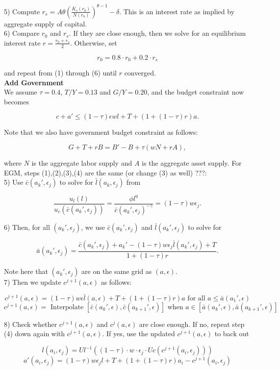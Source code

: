 \documentclass{article}
\begin{document}
		5) Compute $r_{s} = A\theta \left( \frac{K_{s}(r_{0})}{N(r_{0})} \right)^{\theta-1} -\delta$. This is an interest rate as implied by aggregate supply of capital. \\
		
		6) Compare $r_{0}$ and $r_{s}$. If they are close enough, then we solve for an equilibrium interest rate $r = \frac{r_{0}+r_{s}}{2}$. Otherwise, set 
		
		$$r_{0} = 0.8 \cdot r_{0} + 0.2 \cdot r_{s}$$
		
		and repeat from (1) through (6) until $r$ converged. \\
		
		\noindent\textbf{\Large Add Government} \\
		
		We assume $\tau = 0.4$, $T/Y = 0.13$ and $G/Y = 0.20$, and the budget constraint now becomes
		
		$$c+a' \leq (1 -\tau)\epsilon w l + T + (1 + (1 -\tau)r)a.$$
		
		Note that we also have government budget constraint as follows:
		
		$$G + T + rB = B' - B + \tau(wN + rA),$$
		
		where $N$ is the aggregate labor supply and $A$ is the aggregate asset supply. For EGM, steps (1),(2),(3),(4) are the same (or change (3) as well) ???: \\
		
		5) Use $\bar{c}(a_{k}', \epsilon_{j})$ to solve for $\bar{l}(a_{k}, \epsilon_{j})$ from
		
		$$\frac{u_{l}(l)}{u_{c}(\bar{c}(a_{k}', \epsilon_{j}))} = \frac{\phi l^{\eta}}{\bar{c}(a_{k}', \epsilon_{j})^{-\gamma}} = (1-\tau)w\epsilon_{j}.$$
		
		6) Then, for all $(a_{k}',\epsilon_{j})$, we use $\bar{c}(a_{k}',\epsilon_{j})$ and $\bar{l}(a_{k}',\epsilon_{j})$ to solve for 
		
		$$\bar{a}(a_{k}', \epsilon_{j}) = \frac{\bar{c}(a_{k}', \epsilon_{j}) + a_{k}' - (1-\tau) w\epsilon_{j}\bar{l}(a_{k}',\epsilon_{j}) + T}{1+(1-\tau)r}.$$
		
		Note here that $(a_{k}', \epsilon_{j})$ are on the same grid as $(a,\epsilon)$. \\
		
		7) Then we update $c^{j+1}(a,\epsilon)$ as follows:
		
		$$c^{j+1}(a,\epsilon) = (1-\tau) w \epsilon\bar{l}(a,\epsilon) + T + (1+(1-\tau)r)a  \text{ for all } a \leq \bar{a}(a_{1}', \epsilon)$$
		$$c^{j+1}(a,\epsilon) = \text{ Interpolate } [\bar{c}(a_{k}', \epsilon), \bar{c}(a_{k+1}', \epsilon)] \text{ when } a \in [\bar{a}(a_{k}', \epsilon), \bar{a}(a_{k+1}', \epsilon)]$$
	
		8) Check whether $c^{j+1}(a,\epsilon)$ and $c^{j}(a,\epsilon)$ are close enough. If no, repeat step (4) down again with $c^{j+1}(a,\epsilon)$. If yes, use the updated $c^{j+1}(a,\epsilon)$ to back out 
		
		$$l(a_{i},\epsilon_{j}) = Ul^{-1}((1-\tau) \cdot w \cdot \epsilon_{j} \cdot Uc(c^{j+1}(a_{i},\epsilon_{j})))$$
		$$a'(a_{i},\epsilon_{j}) =  (1-\tau) w \epsilon_{j} l + T + (1+(1-\tau)r)a_{i} - c^{j+1}(a_{i},\epsilon_{j}) $$

	
	
\end{document}
